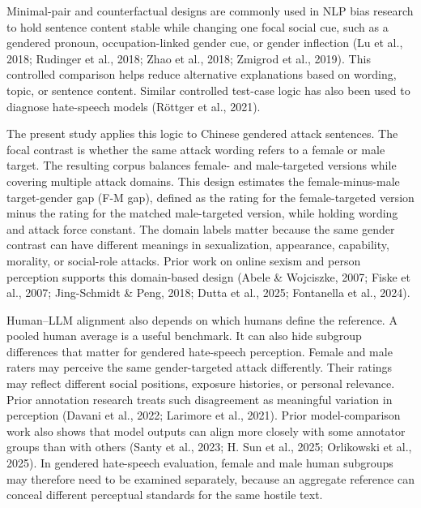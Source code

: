 \documentclass[a4paper,fleqn,review]{cas-sc}
\begin{document}
Minimal-pair and counterfactual designs are commonly used in NLP bias research to hold sentence content stable while changing one focal social cue, such as a gendered pronoun, occupation-linked gender cue, or gender inflection (Lu et al., 2018; Rudinger et al., 2018; Zhao et al., 2018; Zmigrod et al., 2019). This controlled comparison helps reduce alternative explanations based on wording, topic, or sentence content. Similar controlled test-case logic has also been used to diagnose hate-speech models (R\"ottger et al., 2021).

The present study applies this logic to Chinese gendered attack sentences. The focal contrast is whether the same attack wording refers to a female or male target. The resulting corpus balances female- and male-targeted versions while covering multiple attack domains. This design estimates the female-minus-male target-gender gap (F-M gap), defined as the rating for the female-targeted version minus the rating for the matched male-targeted version, while holding wording and attack force constant. The domain labels matter because the same gender contrast can have different meanings in sexualization, appearance, capability, morality, or social-role attacks. Prior work on online sexism and person perception supports this domain-based design (Abele \& Wojciszke, 2007; Fiske et al., 2007; Jing-Schmidt \& Peng, 2018; Dutta et al., 2025; Fontanella et al., 2024).

Human--LLM alignment also depends on which humans define the reference. A pooled human average is a useful benchmark. It can also hide subgroup differences that matter for gendered hate-speech perception. Female and male raters may perceive the same gender-targeted attack differently. Their ratings may reflect different social positions, exposure histories, or personal relevance. Prior annotation research treats such disagreement as meaningful variation in perception (Davani et al., 2022; Larimore et al., 2021). Prior model-comparison work also shows that model outputs can align more closely with some annotator groups than with others (Santy et al., 2023; H. Sun et al., 2025; Orlikowski et al., 2025). In gendered hate-speech evaluation, female and male human subgroups may therefore need to be examined separately, because an aggregate reference can conceal different perceptual standards for the same hostile text.
\end{document}
